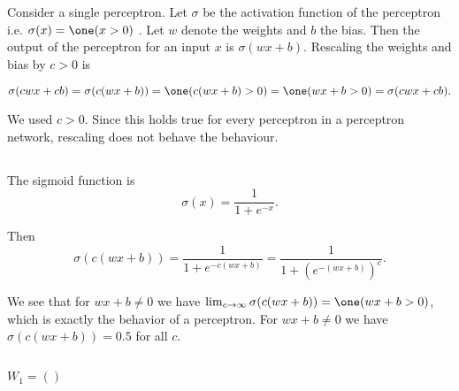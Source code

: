 \documentclass{article}
\begin{document}
\section{}
\section{}
\section{}
\section{}
\subsection{}
Consider a single perceptron. Let $\sigma$ be the activation function of the perceptron i.e. $\sigma(x)= \one (x >0)$ . Let $w$ denote the weights and $b$ the bias. Then the output of the perceptron for an input $x$ is $\sigma(w x +b)$. Rescaling the weights and bias by $c>0$ is 

$$\sigma(cw x +cb)=\sigma(c(w x +b))= \one (c(w x +b) >0)= \one (w x +b >0)=\sigma(cw x +cb).$$

We used $c>0$. Since this holds true for every perceptron in a perceptron network, rescaling does not behave the behaviour. 
\subsection{}
The sigmoid function is
$$\sigma(x)=\frac{1}{1+e^{-x}}.$$

Then 
$$\sigma(c(w x +b))=\frac{1}{1+e^{-c(w x +b)}}=\frac{1}{1+(e^{-(w x +b)})^c}.$$

We see that for $w x +b\neq 0$ we have $\lim_{c\to \infty}\sigma(c(w x +b))=\one (w x +b >0)$, which is exactly the behavior of a perceptron. For $w x +b\neq 0$ we have $\sigma(c(w x +b))=0.5$ for all $c$.
\subsection{}
$W_1 = ()$
\end{document}

